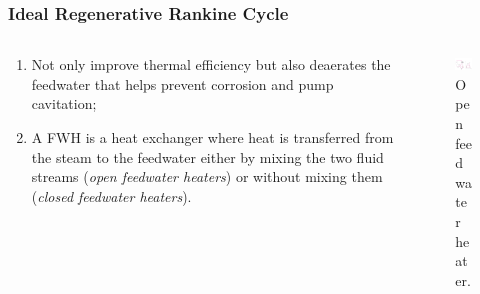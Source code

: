 \documentclass[10pt,compress,handout,ignorenonframetext]{beamer}
\begin{document}
\begin{frame}
 \frametitle{Ideal Regenerative Rankine Cycle}
  \begin{columns}
   \begin{column}[c]{0.5\linewidth}
    \begin{enumerate} %
     \item <1-> Not only improve thermal efficiency but also deaerates the feedwater that helps prevent corrosion and pump cavitation;
     \item <2-> A FWH is a heat exchanger where heat is transferred from the steam to the feedwater either by mixing the two fluid streams ({\it open feedwater heaters}) or without mixing them ({\it closed feedwater heaters}).
    \end{enumerate} 
   \end{column}

   \begin{column}[c]{0.5\linewidth} 
    \begin{figure}%
     \begin{center}
      \includegraphics[width=6.25cm,clip]{./Pics/Regenerative_Rankine_Cycle_OpenFWH}
      \caption{\scriptsize Open feedwater heater.} 
     \end{center}
    \end{figure}  
   \end{column}
  \end{columns}
 \normalsize
\end{frame}
\end{document}
